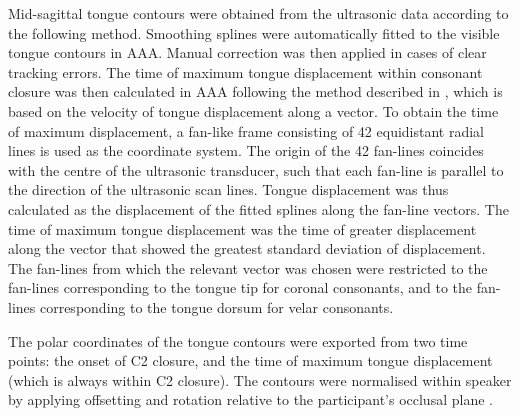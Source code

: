 \documentclass[]{JASAnew}
\begin{document}
Mid-sagittal tongue contours were obtained from the ultrasonic data
according to the following method. Smoothing splines were automatically
fitted to the visible tongue contours in AAA. Manual correction was then
applied in cases of clear tracking errors. The time of maximum tongue
displacement within consonant closure was then calculated in AAA
following the method described in \citet{strycharczuk2015}, which is
based on the velocity of tongue displacement along a vector. To obtain
the time of maximum displacement, a fan-like frame consisting of 42
equidistant radial lines is used as the coordinate system. The origin of
the 42 fan-lines coincides with the centre of the ultrasonic transducer,
such that each fan-line is parallel to the direction of the ultrasonic
scan lines. Tongue displacement was thus calculated as the displacement
of the fitted splines along the fan-line vectors. The time of maximum
tongue displacement was the time of greater displacement along the
vector that showed the greatest standard deviation of displacement. The
fan-lines from which the relevant vector was chosen were restricted to
the fan-lines corresponding to the tongue tip for coronal consonants,
and to the fan-lines corresponding to the tongue dorsum for velar
consonants.

The polar coordinates of the tongue contours were exported from two time
points: the onset of C2 closure, and the time of maximum tongue
displacement (which is always within C2 closure). The contours were
normalised within speaker by applying offsetting and rotation relative
to the participant's occlusal plane \citep{scobbie2011}.










\end{document}
